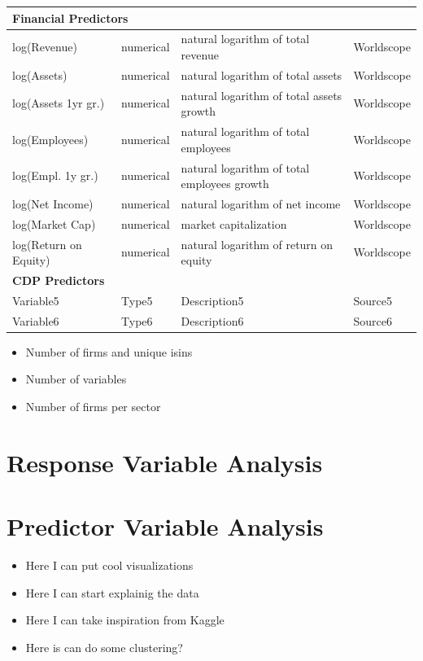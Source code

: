 \begin{longtable}{lp{2cm}p{6cm}p{2cm}}
    \midrule
    \multicolumn{4}{l}{\textbf{Financial Predictors}} \\
    \midrule
    log(Revenue) & numerical & natural logarithm of total revenue & Worldscope \\
    log(Assets) & numerical & natural logarithm of total assets & Worldscope \\
    log(Assets 1yr gr.) & numerical & natural logarithm of total assets growth & Worldscope \\
    log(Employees) & numerical & natural logarithm of total employees & Worldscope \\
    log(Empl. 1y gr.) & numerical & natural logarithm of total employees growth & Worldscope \\
    log(Net Income) & numerical & natural logarithm of net income & Worldscope \\
    log(Market Cap) & numerical & market capitalization & Worldscope \\
    log(Return on Equity) & numerical & natural logarithm of return on equity & Worldscope \\
    \midrule
    \multicolumn{4}{l}{\textbf{CDP Predictors}} \\
    \midrule
    Variable5 & Type5 & Description5 & Source5 \\
    Variable6 & Type6 & Description6 & Source6 \\
    
    \bottomrule
\end{longtable}






\newpage

\begin{itemize}
    \item Number of firms and unique isins
    \item Number of variables
    \item Number of firms per sector
\end{itemize}

\section{Response Variable Analysis}

\section{Predictor Variable Analysis}
\begin{itemize}
    \item Here I can put cool visualizations
    \item Here I can start explainig the data
    \item Here I can take inspiration from Kaggle
    \item Here is can do some clustering?
\end{itemize}
